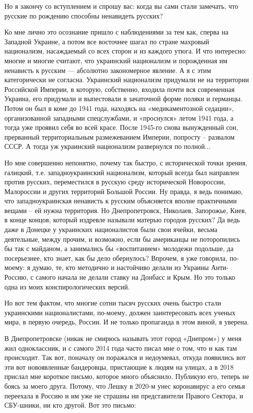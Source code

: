 Но я закончу со вступлением и спрошу вас: когда вы сами стали замечать, что
русские по рождению способны ненавидеть русских?

Ко мне лично это осознание пришло с наблюдениями за тем как, сперва на Западной
Украине, а потом все восточнее шагал по стране махровый национализм,
насаждаемый со всех сторон и из каждого утюга. И что интересно: многие и многие
считают, что украинский национализм и порожденная им ненависть к русским —
абсолютно закономерное явление. А я с этим категорически не согласна.
Украинский национализм придумали не на территории Российской Империи, в
которую, собственно, входила почти вся современная Украина, его придумали и
выпестовали в зачаточной форме поляки и германцы. Потом он был в коме до 1941
года, находясь на «медикаментозной седации», организованной западными
спецслужбами, и «проснулся» летом 1941 года, а тогда уже проявил себя во всей
красе. После 1945-го снова вынужденный сон, прерванный территориальным
размежеванием Империи, попросту – развалом СССР. А тогда уж украинский
национализм развернулся по полной...


Но мне совершенно непонятно, почему так быстро, с исторической точки зрения,
галицкий, т.е. западноукраинский национализм, который всегда был направлен
против русских, переместился в русскую среду исторической Новороссии,
Малороссии и других территорий Большой России. Ну правда, я ведь понимаю, что
западноукраинская ненависть к русским объясняется вполне практичными вещами –
ей нужна территория. Но Днепропетровск, Николаев, Запорожье, Киев, в конце
концов, который издревле называли матерью городов русских? Да ведь даже в
Донецке у украинских националистов были свои ячейки, весьма деятельные, между
прочим, и возможно, если бы американцы не поторопились бы так с майданом, а
занимались бы «воспитанием» молодежи подольше, да посерьезнее, кто знает, как
бы дело обернулось? Впрочем, я уже говорила, по-моему: я думаю, те, кто
методично и настойчиво делали из Украины Анти-Россию, с самого начала не делали
ставку на Донбасс и Крым. Но это только одна из моих конспирологических версий.

Но вот тем фактом, что многие сотни тысяч русских очень быстро стали
украинскими националистами, по-моему, должен заинтересовать всех ученых мира, в
первую очередь, России. И не только пропаганда в этом виной, я уверена.


В Днепропетровске (никак не смирюсь называть этот город «Днепром») у меня жил
одноклассник, и с самого 2014 года часто писал мне о том, что и как там
происходит. Так вот, поначалу он поражался и недоумевал, откуда появились вот
эти вот новоявленные бандеровцы, пристающие к людям на улицах, а в 2018 прислал
мне короткое письмо, которое много объяснило. Публикую его, теперь не боясь за
моего друга. Потому, что Лешку в 2020-м унес коронавирус а его семья переехала
в Россию и им уже не страшны ни представители Правого Сектора, и СБУ-шники, ни
кто другой. Вот это письмо:

